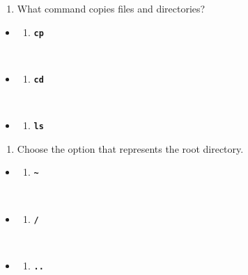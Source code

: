 \documentclass[
  letterpaper,
  DIV=11,
  numbers=noendperiod]{scrreprt}
\providecommand{\tightlist}{%
  \setlength{\itemsep}{0pt}\setlength{\parskip}{0pt}}
\begin{document}
\begin{enumerate}
\def\labelenumi{\arabic{enumi}.}
\setcounter{enumi}{2}
\tightlist
\item
  What command copies files and directories?
\end{enumerate}

\begin{itemize}
\tightlist
\item
  \begin{enumerate}
  \def\labelenumi{(\Alph{enumi})}
  \tightlist
  \item
    \textbf{\texttt{cp}}\strut \\
  \end{enumerate}
\item
  \begin{enumerate}
  \def\labelenumi{(\Alph{enumi})}
  \setcounter{enumi}{1}
  \tightlist
  \item
    \textbf{\texttt{cd}}\strut \\
  \end{enumerate}
\item
  \begin{enumerate}
  \def\labelenumi{(\Alph{enumi})}
  \setcounter{enumi}{2}
  \tightlist
  \item
    \textbf{\texttt{ls}}
  \end{enumerate}
\end{itemize}

\begin{enumerate}
\def\labelenumi{\arabic{enumi}.}
\setcounter{enumi}{3}
\tightlist
\item
  Choose the option that represents the root directory.
\end{enumerate}

\begin{itemize}
\tightlist
\item
  \begin{enumerate}
  \def\labelenumi{(\Alph{enumi})}
  \tightlist
  \item
    \textbf{\texttt{\textasciitilde{}}}\strut \\
  \end{enumerate}
\item
  \begin{enumerate}
  \def\labelenumi{(\Alph{enumi})}
  \setcounter{enumi}{1}
  \tightlist
  \item
    \textbf{\texttt{/}}\strut \\
  \end{enumerate}
\item
  \begin{enumerate}
  \def\labelenumi{(\Alph{enumi})}
  \setcounter{enumi}{2}
  \tightlist
  \item
    \textbf{\texttt{..}}
  \end{enumerate}
\end{itemize}
\end{document}
